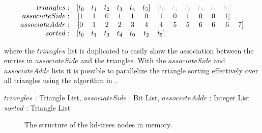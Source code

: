 \begin{displaymath}
  \begin{array}{r c c c c c c c c c c c c c}
    triangles: & [t_0 & t_1 & t_2 & t_3 & t_4 & t_5] & \color{lightgray}[t_0 & \color{lightgray}t_1 & \color{lightgray}t_2 & \color{lightgray}t_3 & \color{lightgray}t_4 & \color{lightgray}t_5]\\
    associateSide: & [1 & 1 & 0 & 1 & 1 & 0 & 1 & 0 & 1 & 0 & 0 & 1]\\
    associateAddr: & [0 & 1 & 2 & 2 & 3 & 4 & 4 & 5 & 5 & 6 & 6 & 6 & 7]\\
    sorted: & [t_0 & t_1 & t_3 & t_4 & t_0 & t_2 & t_5]
  \end{array}
\end{displaymath}

where the $triangles$ list is duplicated to easily show the association between
the entries in $associateSide$ and the triangles. With the $associateSide$ and
$associateAddr$ lists it is possible to parallelize the triangle sorting
effectively over all triangles using the algorithm in .

\begin{algorithm}
  \caption{Parallel triangle sorting.}
  \label{alg:triangleSort}
  \begin{algorithmic}
              {$triangles$ : Triangle List, $associateSide$ : Bit List, $associateAddr$ : Integer List}
              {$sorted$ : Triangle List}
              {
                \ENDIF
                \ENDIF
               \ENDFOR}
  \end{algorithmic}
\end{algorithm}


\begin{figure}
  \centering
  \caption{The structure of the kd-trees nodes in memory.}
  \label{fig:nodeStructure}
\end{figure}


